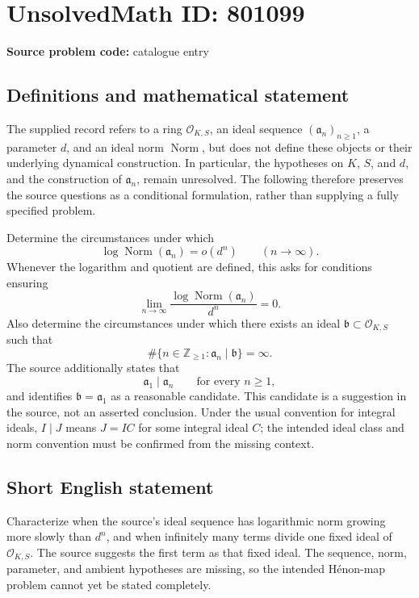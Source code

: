 \documentclass[11pt]{article}
\newcommand{\Z}{\mathbb{Z}}
\begin{document}
\section*{UnsolvedMath ID: 801099}
\textbf{Source problem code:} catalogue entry
\subsection{Definitions and mathematical statement}
The supplied record refers to a ring \(\mathcal{O}_{K,S}\), an ideal sequence \((\mathfrak{a}_n)_{n\geq 1}\), a parameter \(d\), and an ideal norm \(\operatorname{Norm}\), but does not define these objects or their underlying dynamical construction. In particular, the hypotheses on \(K\), \(S\), and \(d\), and the construction of \(\mathfrak{a}_n\), remain unresolved. The following therefore preserves the source questions as a conditional formulation, rather than supplying a fully specified problem.

Determine the circumstances under which
\[
\log\operatorname{Norm}(\mathfrak{a}_n)=o(d^n)
\qquad (n\to\infty).
\]
Whenever the logarithm and quotient are defined, this asks for conditions ensuring
\[
\lim_{n\to\infty}\frac{\log\operatorname{Norm}(\mathfrak{a}_n)}{d^n}=0.
\]
Also determine the circumstances under which there exists an ideal \(\mathfrak{b}\subset\mathcal{O}_{K,S}\) such that
\[
\#\{n\in\Z_{\geq 1}:\mathfrak{a}_n\mid\mathfrak{b}\}=\infty.
\]
The source additionally states that
\[
\mathfrak{a}_1\mid\mathfrak{a}_n\qquad\text{for every }n\geq 1,
\]
and identifies \(\mathfrak{b}=\mathfrak{a}_1\) as a reasonable candidate. This candidate is a suggestion in the source, not an asserted conclusion. Under the usual convention for integral ideals, \(I\mid J\) means \(J=IC\) for some integral ideal \(C\); the intended ideal class and norm convention must be confirmed from the missing context.
\subsection{Short English statement}
Characterize when the source's ideal sequence has logarithmic norm growing more slowly than \(d^n\), and when infinitely many terms divide one fixed ideal of \(\mathcal{O}_{K,S}\). The source suggests the first term as that fixed ideal. The sequence, norm, parameter, and ambient hypotheses are missing, so the intended H\'enon-map problem cannot yet be stated completely.
\end{document}
